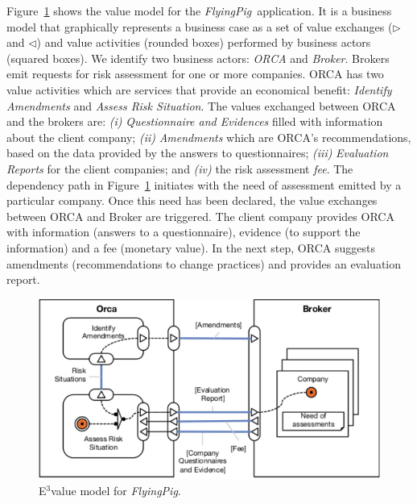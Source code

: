 \documentclass{singlecol-new}
\theoremstyle{TH}{
\newtheorem{lemma}{Lemma}
\newtheorem{theorem}[lemma]{Theorem}
\newtheorem{corrolary}[lemma]{Corrolary}
\newtheorem{conjecture}[lemma]{Conjecture}
\newtheorem{proposition}[lemma]{Proposition}
\newtheorem{claim}[lemma]{Claim}
\newtheorem{stheorem}[lemma]{Wrong Theorem}
\newtheorem{algorithm}{Algorithm}
}
\theoremstyle{THrm}{
\newtheorem{definition}{Definition}[section]
\newtheorem{question}{Question}[section]
\newtheorem{remark}{Remark}
\newtheorem{scheme}{Scheme}
}
\theoremstyle{THhit}{
\newtheorem{case}{Case}[section]
}
\theoremstyle{THhsl}{
\newtheorem{example}{Example}
}
\def\FlyingPig{\textsl{FlyingPig}\xspace}
\begin{document}
Figure~\ref{fig:E3valuemodel} shows the value model for the \FlyingPig\ application.
It is a business model that graphically represents a business case as a set of value exchanges ($\triangleright$ and $\triangleleft$) and value activities (rounded boxes) performed by business actors (squared boxes).
We identify two business actors: \textsl{ORCA} and \textsl{Broker}.
Brokers emit requests for risk assessment for one or more companies.
ORCA has two value activities which are services that provide an economical benefit:  \textsl{Identify Amendments} and \textsl{Assess Risk Situation}.
The values exchanged between ORCA and the brokers are:
\textit{(i)} \textsl{Questionnaire and Evidences} filled with information about the client company;
\textit{(ii)} \textsl{Amendments} which are ORCA's rec\-om\-men\-da\-tions, based on the data provided by the answers to questionnaires;
\textit{(iii)} \textsl{Evaluation Reports} for the client companies;
and
\textit{(iv)} the risk assessment \textsl{fee}.
%
The dependency path in Figure~\ref{fig:E3valuemodel} initiates with the need of assessment emitted by a particular company.
Once this need has been declared, the value exchanges between ORCA and Broker are triggered.
The client company provides ORCA with information (answers to a questionnaire), evidence (to support the information) and a fee (monetary value).
In the next step, ORCA suggests amendments (recommendations to change practices) and provides an evaluation report.

\begin{figure}[h]
\centering
\includegraphics[width=1\textwidth]{./figures/3ValueModel.pdf}
\caption{E$^3$value model for \FlyingPig.\label{fig:E3valuemodel}}
\end{figure}
\end{document}
